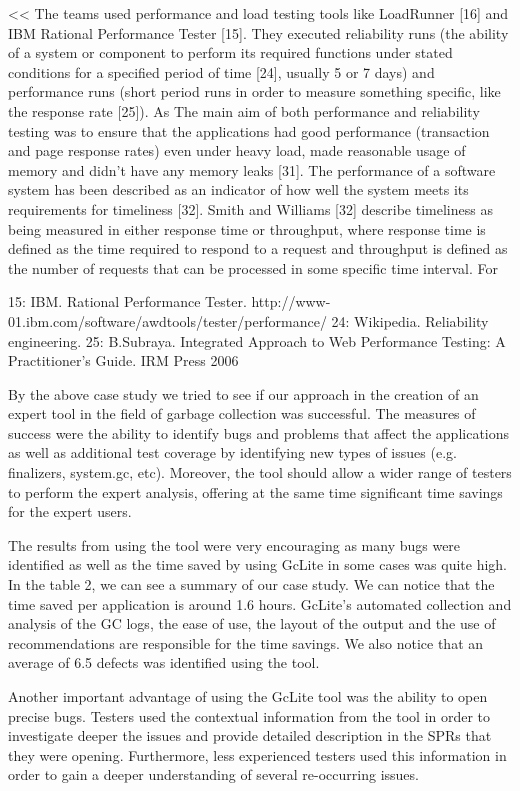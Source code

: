 \documentclass[runningheads,a4paper]{llncs}
\begin{document}
<<
The teams used performance and load testing tools like
LoadRunner [16] and IBM Rational Performance Tester [15]. They executed reliability runs 
(the ability of a system or component to perform its required functions under stated 
conditions for a specified period of time [24], usually 5 or 7 days) and performance runs 
(short period runs in order to measure something specific, like the response rate [25]).
 As The main aim of both performance and reliability testing
was to ensure that the applications had good performance (transaction and page response rates) even under heavy load, made reasonable usage of memory and didn’t have any memory leaks [31]. The performance of a software system has been described as an indicator of how well the system meets its requirements for timeliness [32]. Smith and Williams [32] describe timeliness as being measured in either response time or throughput, where response time is defined as the time required to respond to a request and throughput is defined as the number of requests that can be processed in some specific time interval. For

15: IBM. Rational Performance Tester. http://www-01.ibm.com/software/awdtools/tester/performance/ 
24: Wikipedia. Reliability engineering.
25: B.Subraya. Integrated Approach to Web Performance Testing: A Practitioner's Guide. IRM Press 2006

By the above case study we tried to see if our approach in
the creation of an expert tool in the field of garbage collection was successful. The measures of success were the ability to
identify bugs and problems that affect the applications as well as additional
test coverage by identifying new types of issues (e.g. finalizers, system.gc, etc). Moreover, the tool should allow a wider range of testers to perform the expert analysis, offering at the same time significant time savings for the expert users. 

The results from using the tool were very encouraging as
many bugs were identified as well as the time saved by using GcLite in some cases was 
quite high. In the table 2, we can see a summary of our case study. We can notice that 
the time saved per application is around 1.6 hours. GcLite’s automated collection and 
analysis of the GC logs, the ease of use, the layout of the output and the use of 
recommendations are responsible for the time savings. We also notice that an average of 
6.5 defects was identified using the tool.

Another important advantage of using the GcLite tool was
the ability to open precise bugs. Testers used the contextual information from the tool 
in order to investigate deeper the issues and provide detailed description in the SPRs 
that they were opening. Furthermore, less experienced testers used this information in 
order to gain a deeper understanding of several re-occurring issues.
\end{document}
